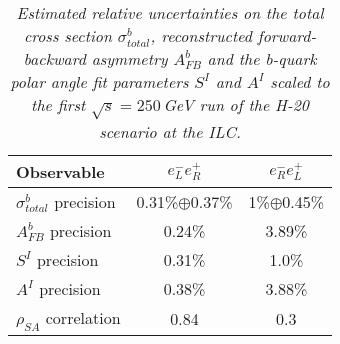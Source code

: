         \begin{table}
        \begin{center}
        \begin{tabular}{l c c}
        \hline
	Observable &  $e^-_Le^+_R$ &  $e^-_Re^+_L$\\
	\hline
	$\sigma^b_{total}$ precision  & 0.31\%$\oplus$0.37\%   & 1\%$\oplus$0.45\% \\
	$A_{FB}^{b}$ precision	  & 0.24\%  			  & 3.89\% \\
	\hline
	$S^I $ 	precision			  & 0.31\% 				  & 1.0\% \\
	$A^I $ 	precision			  & 0.38\% 				  & 3.88\% \\
	$\rho_{SA}$ correlation		  & 0.84				  & 0.3 \\
        \hline
        \end{tabular}
        \end{center}
        \caption{\sl Estimated relative uncertainties on the total cross section $\sigma^b_{total}$, reconstructed forward-backward asymmetry $A_{FB}^{b}$ and the b-quark polar angle fit parameters $S^I$ and $A^I$ scaled to the first $\sqrt{s}=250$\,GeV run of the H-20 scenario at the ILC. }
        \label{table:bbbarfinal}
        \end{table}
